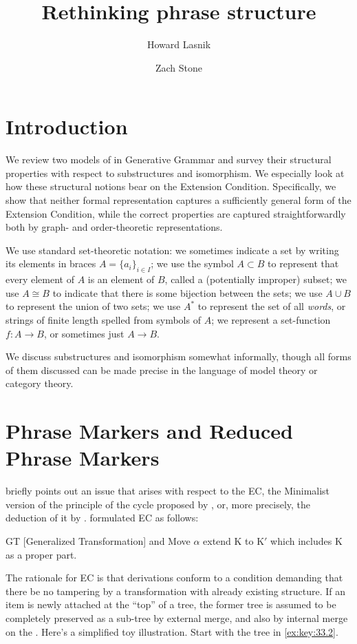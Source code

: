 \documentclass[output=paper]{langsci/langscibook}
\author{Howard Lasnik\affiliation{University of Maryland at College Park}\and Zach Stone\affiliation{University of Maryland at College Park}}
\title{Rethinking phrase structure}
\begin{document}
\glsresetall

\section{Introduction}

We review two models of  in Generative Grammar and survey their
structural properties with respect to substructures and isomorphism. We
especially look at how these structural notions bear on the Extension
Condition. Specifically, we show that neither formal representation captures a
sufficiently general form of the Extension Condition, while the correct
properties are captured straightforwardly both by graph- and order-theoretic
representations.

We use standard set-theoretic notation: we sometimes indicate a set by writing
its elements  in braces $A=\{a_i\}_{i\in I}$; we use the symbol $A\subset B$ to
represent that every element of $A$ is an element of $B$, called a (potentially
improper) subset; we use $A\cong B$ to indicate that there is some bijection
between the sets; we use $A\cup B$ to represent the union of two sets; we use
$A^*$ to represent the set of all \emph{words}, or strings of finite length
spelled from symbols of $A$; we represent a set-function $f:A\rightarrow B$, or
sometimes just $A\rightarrow B$.

We discuss substructures and isomorphism somewhat informally, though all forms
of them discussed can be made precise in the language of model theory or
category theory.

\section{Phrase Markers and Reduced Phrase Markers}

\citet{conceptions} briefly points out an issue that arises with respect to the
\gls{EC}, the Minimalist version of the principle of the cycle proposed by
\cite{Chomsky1993}, or, more precisely, the deduction of it by
\cite{Chomsky2000}. \textcite[22]{Chomsky1993} formulated \gls{EC} as follows:

\ea\label{ex:key:33.1} GT [Generalized
    Transformation] and Move $\alpha$ extend K to K$'$ which includes K
    as a proper part.
\z

The \textcite{Chomsky2000} rationale for \gls{EC} is that derivations conform to a
condition demanding that there be no tampering by a transformation with already
existing structure. If an item is newly attached at the \enquote{top} of a tree, the
former tree is assumed to be completely preserved as a sub-tree by external
merge, and also by internal merge on the . Here's a
simplified toy illustration. Start with the tree in \eqref{ex:key:33.2}.
\end{document}
